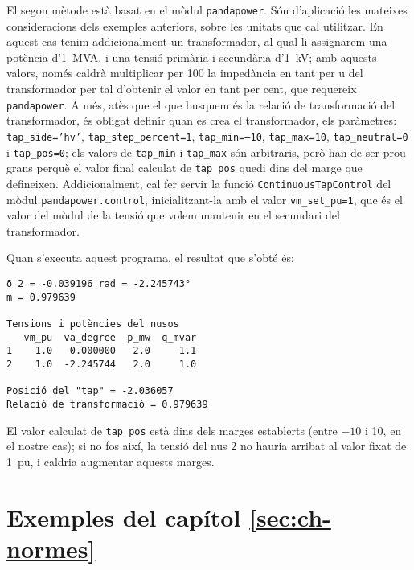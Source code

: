 El segon mètode està basat en el mòdul \texttt{pandapower}. Són d'aplicació les mateixes consideracions dels exemples anteriors, sobre les unitats que cal utilitzar. En aquest cas tenim addicionalment un transformador, al qual li assignarem una potència d'\qty{1}{MVA}, i una tensió primària i secundària d'\qty{1}{kV}; amb aquests valors, només caldrà multiplicar per 100 la impedància en tant per u  del transformador per tal d'obtenir el valor en tant per cent, que requereix \texttt{pandapower}. A més, atès que el que busquem és la relació de transformació del transformador, és obligat definir quan es crea el transformador, els paràmetres: \texttt{tap\_side='hv'}, \texttt{tap\_step\_percent=1}, \texttt{tap\_min=--10}, \texttt{tap\_max=10}, \texttt{tap\_neutral=0} i  \texttt{tap\_pos=0}; els valors de \texttt{tap\_min} i \texttt{tap\_max} són arbitraris, però han de ser prou grans perquè el valor final calculat de \texttt{tap\_pos} quedi dins del marge que defineixen. Addicionalment, cal fer servir la funció \texttt{ContinuousTapControl} del mòdul \texttt{pandapower.control}, inicialitzant-la amb el valor \texttt{vm\_set\_pu=1}, que és el valor del mòdul de la tensió que volem mantenir en el secundari del transformador.

\break



Quan s'executa aquest programa, el resultat que s'obté és:
\lstset{
	language=,
	numbers=none,
	frame=none
}
\begin{lstlisting}
δ_2 = -0.039196 rad = -2.245743°
m = 0.979639

Tensions i potències del nusos
   vm_pu  va_degree  p_mw  q_mvar
1    1.0   0.000000  -2.0    -1.1
2    1.0  -2.245744   2.0     1.0

Posició del "tap" = -2.036057
Relació de transformació = 0.979639
\end{lstlisting}

El valor calculat de \texttt{tap\_pos} està dins dels marges establerts (entre $-10$ i 10, en el nostre cas); si no fos així, la tensió del nus 2 no hauria arribat al valor fixat de \qty{1}{pu}, i caldria augmentar aquests marges.




\section{Exemples del capítol \ref*{sec:ch-normes}}

